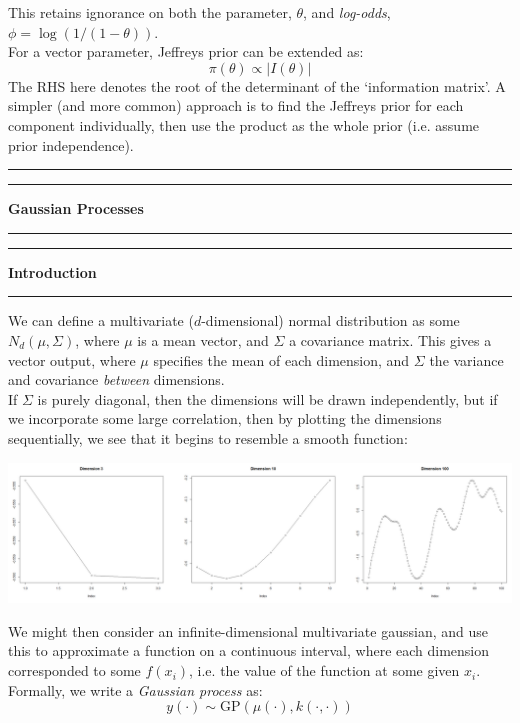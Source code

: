 \documentclass[12pt]{article}
\newcommand{\minisection}[1]{
    \par\vspace{0.25cm}
    \textbf{#1}\par
    \vspace{0.1cm}
    \hrule
    \vspace{0.25cm}
}
\newcommand{\doubleline}{
    \hrule
    \vspace*{0.05cm}
    \hrule
    \vspace*{0.25cm}
}
\begin{document}
    This retains ignorance on both the parameter, $\theta$, and \textit{log-odds}, $\phi = \log(1/(1-\theta))$.\\
    For a vector parameter, Jeffreys prior can be extended as:
    \begin{equation*}
        \pi(\theta) \propto \left| I(\theta)\right|
    \end{equation*}
    The RHS here denotes the root of the determinant of the `information matrix'. A simpler (and more common) approach is to find the Jeffreys prior for each component individually, then use the product as the whole prior (i.e. assume prior independence).
    \vspace*{0.5cm}
    \doubleline
    \begin{center}
        \huge \textbf{Gaussian Processes}
    \end{center}
    \doubleline
    \minisection{Introduction}
    We can define a multivariate ($d$-dimensional) normal distribution as some $N_d(\mu,\Sigma)$, where $\mu$ is a mean vector, and $\Sigma$ a covariance matrix. This gives a vector output, where $\mu$ specifies the mean of each dimension, and $\Sigma$ the variance and covariance \textit{between} dimensions.\\
    If $\Sigma$ is purely diagonal, then the dimensions will be drawn independently, but if we incorporate some large correlation, then by plotting the dimensions sequentially, we see that it begins to resemble a smooth function:
    \begin{center}
        \includegraphics[width=15cm]{ex_gausses.png}
    \end{center}
    We might then consider an infinite-dimensional multivariate gaussian, and use this to approximate a function on a continuous interval, where each dimension corresponded to some $f(x_i)$, i.e. the value of the function at some given $x_i$.\\
    Formally, we write a \textit{Gaussian process} as:
    \begin{equation*}
        y(\cdot) \sim \text{GP}(\mu(\cdot),k(\cdot,\cdot))
    \end{equation*}
\end{document}
